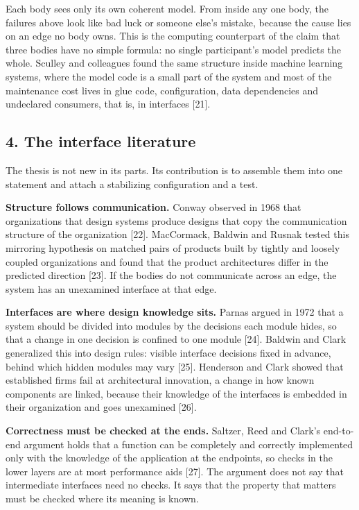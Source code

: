 \documentclass[
  10pt,
]{article}
\begin{document}
Each body sees only its own coherent model. From inside any one body,
the failures above look like bad luck or someone else's mistake, because
the cause lies on an edge no body owns. This is the computing
counterpart of the claim that three bodies have no simple formula: no
single participant's model predicts the whole. Sculley and colleagues
found the same structure inside machine learning systems, where the
model code is a small part of the system and most of the maintenance
cost lives in glue code, configuration, data dependencies and undeclared
consumers, that is, in interfaces {[}21{]}.

\subsection{4. The interface literature}\label{the-interface-literature}

The thesis is not new in its parts. Its contribution is to assemble them
into one statement and attach a stabilizing configuration and a test.

\textbf{Structure follows communication.} Conway observed in 1968 that
organizations that design systems produce designs that copy the
communication structure of the organization {[}22{]}. MacCormack,
Baldwin and Rusnak tested this mirroring hypothesis on matched pairs of
products built by tightly and loosely coupled organizations and found
that the product architectures differ in the predicted direction
{[}23{]}. If the bodies do not communicate across an edge, the system
has an unexamined interface at that edge.

\textbf{Interfaces are where design knowledge sits.} Parnas argued in
1972 that a system should be divided into modules by the decisions each
module hides, so that a change in one decision is confined to one module
{[}24{]}. Baldwin and Clark generalized this into design rules: visible
interface decisions fixed in advance, behind which hidden modules may
vary {[}25{]}. Henderson and Clark showed that established firms fail at
architectural innovation, a change in how known components are linked,
because their knowledge of the interfaces is embedded in their
organization and goes unexamined {[}26{]}.

\textbf{Correctness must be checked at the ends.} Saltzer, Reed and
Clark's end-to-end argument holds that a function can be completely and
correctly implemented only with the knowledge of the application at the
endpoints, so checks in the lower layers are at most performance aids
{[}27{]}. The argument does not say that intermediate interfaces need no
checks. It says that the property that matters must be checked where its
meaning is known.
\end{document}
